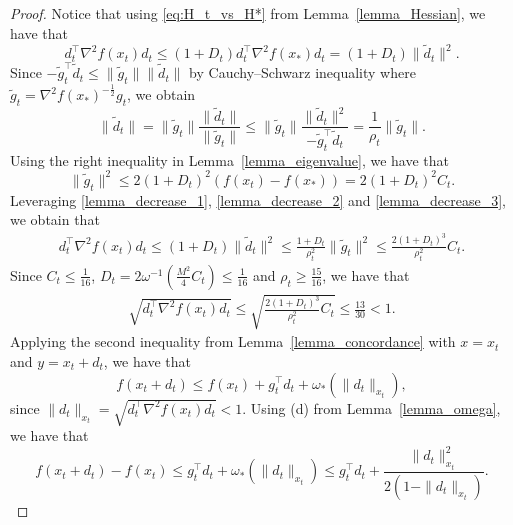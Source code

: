 \documentclass[11pt,letterpaper]{article}
\newcommand\0{{\Vector{0}}}
\newcommand\1{{\Vector{1}}}
\numberwithin{assumption}{section}
\numberwithin{definition}{section}
\numberwithin{theorem}{section}
\numberwithin{remark}{section}
\begin{document}
\begin{proof}
    Notice that using \eqref{eq:H_t_vs_H*} from Lemma~\ref{lemma_Hessian}, we have that
    \begin{equation}\label{lemma_decrease_1}
        d_t^\top\nabla^2{f}(x_t)d_t \leq (1 + D_t)d_t^\top\nabla^2{f}(x_*)d_t = (1 + D_t)\|\tilde{d}_t\|^2.
    \end{equation}
    Since $-\tilde{g}_t^\top \tilde{d}_t \leq \|\tilde{g}_t\|\|\tilde{d}_t\|$ by Cauchy–Schwarz inequality where $\tilde{g}_t = \nabla^2{f(x_*)}^{-\frac{1}{2}}g_t$, we obtain
    \begin{equation}\label{lemma_decrease_2}
        \|\tilde{d}_t\| = \|\tilde{g}_t\|\frac{\|\tilde{d}_t\|}{\|\tilde{g}_t\|} \leq \|\tilde{g}_t\|\frac{\|\tilde{d}_t\|^2}{-\tilde{g}_t^\top \tilde{d}_t} = \frac{1}{\rho_t}\|\tilde{g}_t\|.
    \end{equation}
    Using the right inequality in Lemma~\ref{lemma_eigenvalue}, we have that
    \begin{equation}\label{lemma_decrease_3}
        \|\tilde{g}_t\|^2 \leq 2(1 + D_t)^{2}(f(x_t) - f(x_*)) = 2(1 + D_t)^{2}C_t.
    \end{equation}
    Leveraging \eqref{lemma_decrease_1}, \eqref{lemma_decrease_2} and \eqref{lemma_decrease_3}, we obtain that
    \begin{align*}
        d_t^\top\nabla^2{f}(x_t)d_t \leq (1 + D_t)\|\tilde{d}_t\|^2 \leq \frac{1 + D_t}{\rho_t^2}\|\tilde{g}_t\|^2 \leq \frac{2(1 + D_t)^3}{\rho_t^2}C_t.
    \end{align*}
    Since $C_t \leq \frac{1}{16}$, $D_t = 2\omega^{-1}(\frac{M^2}{4}C_t) \leq \frac{1}{16}$ and $\rho_t \geq \frac{15}{16}$, we have that
    \begin{align*}
        \sqrt{d_t^\top\nabla^2{f}(x_t)d_t} \leq \sqrt{\frac{2(1 + D_t)^3}{\rho_t^2}C_t} \leq \frac{13}{30} < 1.
    \end{align*}
    Applying the second inequality from Lemma~\ref{lemma_concordance} with $x = x_t$ and $y = x_t + d_t$, we have that
    \begin{equation*}
        f(x_t +d_t) \leq f(x_t) + g_t^\top d_t + \omega_{*}(\|d_t\|_{x_t}),
    \end{equation*}
    since $\|d_t\|_{x_t} = \sqrt{d_t^\top\nabla^2{f}(x_t)d_t} < 1$. Using (d) from Lemma~\ref{lemma_omega}, we have that
    \begin{equation*}
        f(x_t +d_t) - f(x_t) \leq g_t^\top d_t + \omega_{*}(\|d_t\|_{x_t}) \leq g_t^\top d_t + \frac{\|d_t\|_{x_t}^2}{2(1 - \|d_t\|_{x_t})}.
    \end{equation*}

\end{proof}
\end{document}
